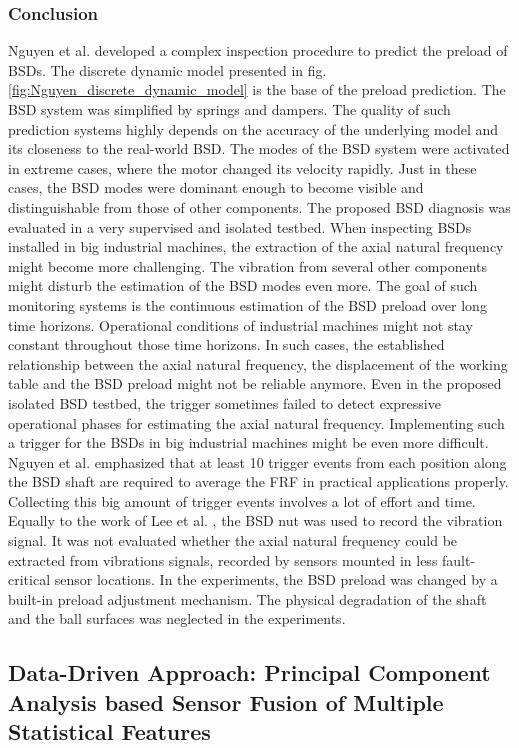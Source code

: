 \subsubsection{Conclusion}
Nguyen et al. \cite{NGUYEN2019} developed a complex inspection procedure to predict the preload of BSDs. The discrete dynamic model presented in fig. \ref{fig:Nguyen_discrete_dynamic_model} is the base of the preload prediction. The BSD system was simplified by springs and dampers. The quality of such prediction systems highly depends on the accuracy of the underlying model and its closeness to the real-world BSD. The modes of the BSD system were activated in extreme cases, where the motor changed its velocity rapidly. Just in these cases, the BSD modes were dominant enough to become visible and distinguishable from those of other components. The proposed BSD diagnosis was evaluated in a very supervised and isolated testbed. When inspecting BSDs installed in big industrial machines, the extraction of the axial natural frequency might become more challenging. The vibration from several other components might disturb the estimation of the BSD modes even more. The goal of such monitoring systems is the continuous estimation of the BSD preload over long time horizons. Operational conditions of industrial machines might not stay constant throughout those time horizons. In such cases, the established relationship between the axial natural frequency, the displacement of the working table and the BSD preload might not be reliable anymore. Even in the proposed isolated BSD testbed, the trigger sometimes failed to detect expressive operational phases for estimating the axial natural frequency. Implementing such a trigger for the BSDs in big industrial machines might be even more difficult. Nguyen et al. \cite{NGUYEN2019} emphasized that at least 10 trigger events from each position along the BSD shaft are required to average the FRF in practical applications properly. Collecting this big amount of trigger events involves a lot of effort and time. Equally to the work of Lee et al. \cite{Lee2015}, the BSD nut was used to record the vibration signal. It was not evaluated whether the axial natural frequency could be extracted from vibrations signals, recorded by sensors mounted in less fault-critical sensor locations. In the experiments, the BSD preload was changed by a built-in preload adjustment mechanism. The physical degradation of the shaft and the ball surfaces was neglected in the experiments.

\subsection{Data-Driven Approach: Principal Component Analysis based Sensor Fusion of Multiple Statistical Features}

